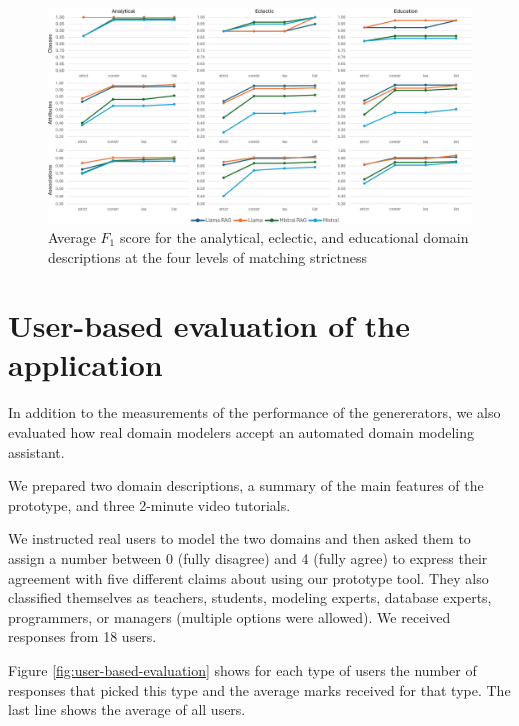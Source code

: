 \begin{figure}[!h]
    \centering
    \includegraphics[scale=0.10]{img/evaluation-simple-f1.png}
    \caption{\centering Average $F_1$ score for the analytical, eclectic, and educational domain descriptions at the four levels of matching strictness}
    \label{fig:evaluation-simple-f1}
\end{figure}


\section{User-based evaluation of the application}

In addition to the measurements of the performance of the genererators, we also evaluated how real domain modelers accept an automated domain modeling assistant.

We prepared two domain descriptions, a summary of the main features of the prototype, and three 2-minute video tutorials.

We instructed real users to model the two domains and then asked them to assign a number between 0 (fully disagree) and 4 (fully agree) to express their agreement with five different claims about using our prototype tool.
They also classified themselves as teachers, students, modeling experts, database experts, programmers, or managers (multiple options were allowed).
We received responses from 18 users.

Figure \ref{fig:user-based-evaluation} shows for each type of users the number of responses that picked this type and the average marks received for that type. The last line shows the average of all users.

